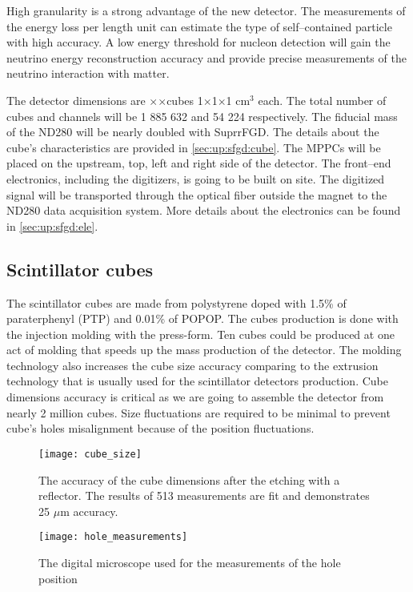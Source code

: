\documentclass[main.tex]{subfiles}
\begin{document}
High granularity is a strong advantage of the new detector. The measurements of the energy loss per length unit can estimate the type of self--contained particle with high accuracy. A low energy threshold for nucleon detection will gain the neutrino energy reconstruction accuracy and provide precise measurements of the neutrino interaction with matter.

The detector dimensions are \sfgdx$\times$\sfgdy$\times$\sfgdz  cubes 1$\times$1$\times$1 $\text{cm}^3$ each. The total number of cubes and channels will be 1 885 632 and 54 224 respectively. The fiducial mass of the ND280 will be nearly doubled with SuprrFGD. The details about the cube's characteristics are provided in \autoref{sec:up:sfgd:cube}. The MPPCs will be placed on the upstream, top, left and right side of the detector. The front--end electronics, including the digitizers, is going to be built on site. The digitized signal will be transported through the optical fiber outside the magnet to the ND280 data acquisition system. More details about the electronics can be found in \autoref{sec:up:sfgd:ele}.

\subsection{Scintillator cubes}
\label{sec:up:sfgd:cube}
The scintillator cubes are made from polystyrene doped with 1.5\% of paraterphenyl (PTP) and 0.01\% of POPOP. The cubes production is done with the injection molding with the press-form. Ten cubes could be produced at one act of molding that speeds up the mass production of the detector. The molding technology also increases the cube size accuracy comparing to the extrusion technology that is usually used for the scintillator detectors production. Cube dimensions accuracy is critical as we are going to assemble the detector from nearly 2 million cubes. Size fluctuations are required to be minimal to prevent cube's holes misalignment because of the position fluctuations.

\begin{figure}[!ht]
	\centering
	\begin{minipage}{0.49\linewidth}
		\centering
		\texttt{[image: cube\_size]}
		\caption{The accuracy of the cube dimensions after the etching with a reflector. The results of 513 measurements are fit and demonstrates 25 $\mu$m accuracy.}
		\label{fig:up:sfgd:cube_s}
	\end{minipage}
	\begin{minipage}{0.49\linewidth}
		\centering
		\texttt{[image: hole\_measurements]}
		\caption{The digital microscope used for the measurements of the hole position}
		\label{fig:up:sfgd:hole_pos}
	\end{minipage}
\end{figure}
\end{document}
